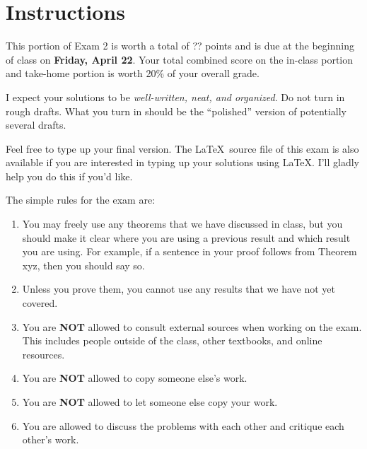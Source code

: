 \documentclass[11pt]{scrartcl}
\theoremstyle{definition}
\begin{document}
\begin{center}

  
  \bigskip
  

\end{center}

\section*{Instructions}

This portion of Exam 2 is worth a total of ?? points and is due at the beginning of class on \textbf{Friday, April 22}.  Your total combined score on the in-class portion and take-home portion is worth 20\% of your overall grade.  

\bigskip

I expect your solutions to be \emph{well-written, neat, and organized}.  Do not turn in rough drafts.  What you turn in should be the ``polished'' version of potentially several drafts.  
 
\bigskip

Feel free to type up your final version.  The \LaTeX\ source file of this exam is also available if you are interested in typing up your solutions using \LaTeX.  I'll gladly help you do this if you'd like.

\bigskip

The simple rules for the exam are:

\begin{enumerate}
\item You may freely use any theorems that we have discussed in class, but you should make it clear where you are using a previous result and which result you are using.  For example, if a sentence in your proof follows from Theorem xyz, then you should say so. 
\item Unless you prove them, you cannot use any results that we have not yet covered.
\item You are \textbf{NOT} allowed to consult external sources when working on the exam.  This includes people outside of the class, other textbooks, and online resources.
\item You are \textbf{NOT} allowed to copy someone else's work.
\item You are \textbf{NOT} allowed to let someone else copy your work.
\item You are allowed to discuss the problems with each other and critique each other's work.
\end{enumerate}
\end{document}
